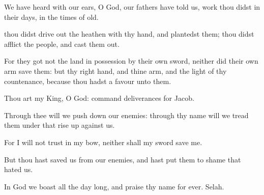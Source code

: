 {\Q {}We have
heard with our
ears, O
God, our
fathers have
told us,
{}
work thou
didst in their
days, in the
times of
old.


\par }{\Q {} thou didst drive
out the
heathen with thy
hand, and
plantedst them;
{} thou didst
afflict the
people, and cast them
out.


\par }{\Q {}For they
got not the
land in
possession by their own
sword, neither did their own
arm
save them: but thy right
hand, and thine
arm, and the
light of thy
countenance, because thou hadst a
favour unto them.


\par }{\Q {}Thou art my
King, O
God:
command
deliverances for
Jacob.


\par }{\Q {}Through thee will we push
down our
enemies: through thy
name will we tread them
under that rise
up against us.


\par }{\Q {}For I will not
trust in my
bow, neither shall my
sword
save me.


\par }{\Q {}But thou hast
saved us from our
enemies, and hast put them to
shame that
hated us.


\par }{\Q {}In
God we
boast all the
day long, and
praise thy
name for
ever.
Selah.


\par }{\BB \par }
